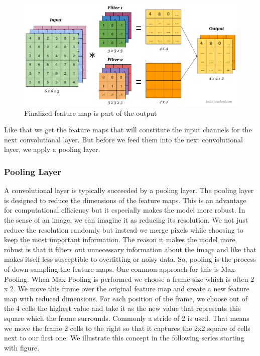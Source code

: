 \documentclass[a4paper,12pt]{report}
\begin{document}
\begin{figure}[htbp]
  \centering
  \includegraphics[width=\textwidth]{images/CNN_filters_7.png}
  \caption{Finalized feature map is part of the output}
  \label{fig:fullwidth}
\end{figure}
Like that we get the feature maps that will constitute the input channels for the next convolutional layer. But before we feed them into the next convolutional layer, we apply a pooling layer.
	
	
	
	\subsubsection{Pooling Layer}
	A convolutional layer is typically succeeded by a pooling layer. The pooling layer is designed to reduce the dimensions of the feature maps. This is an advantage for computational efficiency but it especially makes the model more robust. In the sense of an image, we can imagine it as reducing its resolution. We not just reduce the resolution randomly but instead we merge pixels while choosing to keep the most important information. The reason it makes the model more robust is that it filters out unnecessary information about the image and like that makes itself less susceptible to overfitting or noisy data. So, pooling is the process of down sampling the feature maps. One common approach for this is Max-Pooling. When Max-Pooling is performed we choose a frame size which is often 2 x 2. We move this frame over the original feature map and create a new feature map with reduced dimensions. For each position of the frame, we choose out of the 4 cells the highest value and take it as the new value that represents this square which the frame surrounds. Commonly a stride of 2 is used. That means we move the frame 2 cells to the right so that it captures the 2x2 square of cells next to our first one. We illustrate this concept in the following series starting with figure.
	
\end{document}
